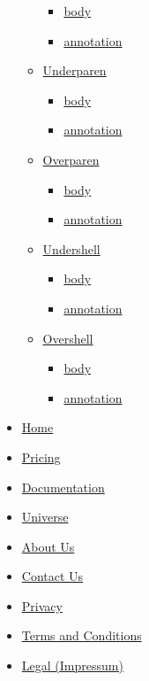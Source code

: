 \begin{itemize}
\begin{itemize}
    \begin{itemize}
    \tightlist
    \item
      \hyperref[functions-overbracket-body]{body}
    \item
      \hyperref[functions-overbracket-annotation]{annotation}
    \end{itemize}
  \item
    \hyperref[functions-underparen]{Underparen}

    \begin{itemize}
    \tightlist
    \item
      \hyperref[functions-underparen-body]{body}
    \item
      \hyperref[functions-underparen-annotation]{annotation}
    \end{itemize}
  \item
    \hyperref[functions-overparen]{Overparen}

    \begin{itemize}
    \tightlist
    \item
      \hyperref[functions-overparen-body]{body}
    \item
      \hyperref[functions-overparen-annotation]{annotation}
    \end{itemize}
  \item
    \hyperref[functions-undershell]{Undershell}

    \begin{itemize}
    \tightlist
    \item
      \hyperref[functions-undershell-body]{body}
    \item
      \hyperref[functions-undershell-annotation]{annotation}
    \end{itemize}
  \item
    \hyperref[functions-overshell]{Overshell}

    \begin{itemize}
    \tightlist
    \item
      \hyperref[functions-overshell-body]{body}
    \item
      \hyperref[functions-overshell-annotation]{annotation}
    \end{itemize}
  \end{itemize}
\end{itemize}

\begin{itemize}
\tightlist
\item
  \href{/}{Home}
\item
  \href{/pricing/}{Pricing}
\item
  \href{/docs/}{Documentation}
\item
  \href{/universe/}{Universe}
\item
  \href{/about/}{About Us}
\item
  \href{/contact/}{Contact Us}
\item
  \href{/privacy/}{Privacy}
\item
  \href{https://typst.app/terms}{Terms and Conditions}
\item
  \href{/legal/}{Legal (Impressum)}
\end{itemize}

